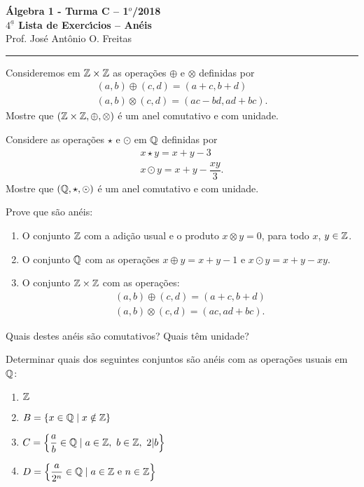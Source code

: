\documentclass[12pt]{article}
\begin{document}


\begin{center}
 {\Large\bf {\'A}lgebra 1 - Turma C -- 1$^{o}$/2018} \\
 \vspace{9pt} {\large\bf $4^{\underline{a}}$ Lista de Exerc{\'\i}cios -- An\'eis}\\
 \vspace{9pt} Prof. Jos{\'e} Ant{\^o}nio O. Freitas
\end{center}
\hrule


\vspace{.6cm}

\questao Consideremos em $\mathbb{Z} \times \mathbb{Z}$ as opera\c{c}\~oes $\oplus$ e $\otimes$ definidas por
\begin{align*}
	(a, b) \oplus (c, d) = (a + c, b + d)\\
	(a ,b) \otimes (c, d) = (ac - bd, ad + bc).
\end{align*}
Mostre que $(\mathbb{Z} \times \mathbb{Z}, \oplus, \otimes)$ \'e um anel comutativo e com unidade.

\vesp

\questao Considere as opera\c{c}\~oes $\star$ e $\odot$ em $\mathbb{Q}$ definidas por
\begin{align*}
	x \star y = x + y - 3\\
	x \odot y = x + y - \dfrac{xy}{3}.
\end{align*}
Mostre que $(\mathbb{Q}, \star, \odot)$ \'e um anel comutativo e com unidade.

\vesp

\questao Prove que s\~ao an\'eis:
\begin{enumerate}[label={\alph*})]
	\item O conjunto $\mathbb{Z}$ com a adi\c{c}\~ao usual e o produto $x \otimes y = 0$, para todo $x$, $y \in \mathbb{Z}$.
	\item O conjunto $\mathbb{Q}$ com as opera\c{c}\~oes $x \oplus y = x + y - 1$ e $x \odot y = x + y - xy$.
	\item O conjunto $\mathbb{Z} \times \mathbb{Z}$ com as opera\c{c}\~oes:
	\begin{align*}
		(a, b) \oplus (c, d) = (a + c, b + d)\\
		(a ,b) \otimes (c, d) = (ac, ad + bc).
	\end{align*}
\end{enumerate}
Quais destes an\'eis s\~ao comutativos? Quais t\^em unidade?

\vesp

\questao Determinar quais dos seguintes conjuntos s\~ao an{\'e}is com as opera\c{c}\~oes usuais em $\mathbb{Q}$:
	\begin{multicols}{2}
		\begin{enumerate}[label=({\alph*})]
			\item $\mathbb{Z}$
			\item $B = \{x \in \mathbb{Q} \mid x \notin \mathbb{Z}\}$
			\item $C = \left\{\dfrac{a}{b} \in \mathbb{Q} \mid a \in \mathbb{Z},\ b \in \mathbb{Z},\ 2 |b \right\}$
			\item $D = \left\{\dfrac{a}{2^n} \in \mathbb{Q} \mid a \in \mathbb{Z} \mbox{ e } n \in \mathbb{Z} \right\}$
		\end{enumerate}
	\end{multicols}
\end{document}
